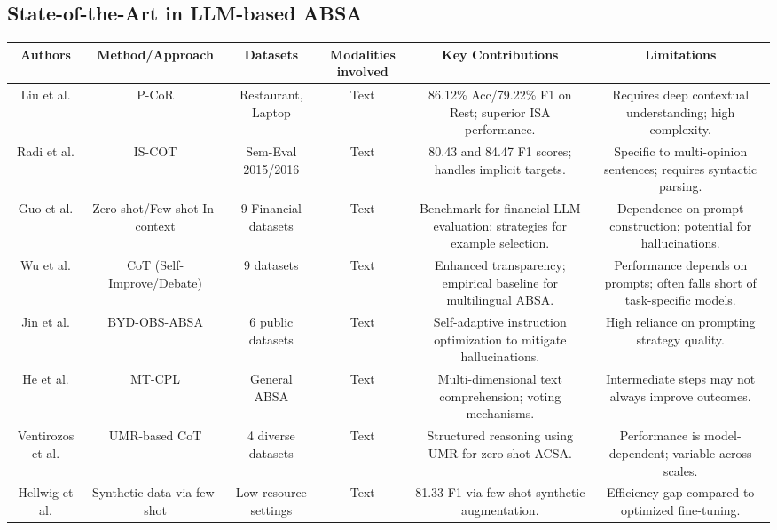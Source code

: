 \documentclass{article}
\begin{document}
\subsection{State-of-the-Art in LLM-based ABSA}
\begin{table}[h!]
\centering
\begin{tabular}{|c|c|c|c|c|c|}
\hline
Authors & Method/Approach & Datasets & Modalities involved & Key Contributions & Limitations \\ \hline
Liu et al.  \parencite{chang_liu_7bb298f7} & P-CoR & Restaurant, Laptop & Text & 86.12\% Acc/79.22\% F1 on Rest; superior ISA performance. & Requires deep contextual understanding; high complexity. \\ \hline
Radi et al.  \parencite{mohammad_radi_96ee5847} & IS-COT & Sem-Eval 2015/2016 & Text & 80.43 and 84.47 F1 scores; handles implicit targets. & Specific to multi-opinion sentences; requires syntactic parsing. \\ \hline
Guo et al.  \parencite{yue_guo_642efc19} & Zero-shot/Few-shot In-context & 9 Financial datasets & Text & Benchmark for financial LLM evaluation; strategies for example selection. & Dependence on prompt construction; potential for hallucinations. \\ \hline
Wu et al.  \parencite{chengyan_wu_4c659eab} & CoT (Self-Improve/Debate) & 9 datasets & Text & Enhanced transparency; empirical baseline for multilingual ABSA. & Performance depends on prompts; often falls short of task-specific models. \\ \hline
Jin et al.  \parencite{weiqiang_jin_5ccfa531} & BYD-OBS-ABSA & 6 public datasets & Text & Self-adaptive instruction optimization to mitigate hallucinations. & High reliance on prompting strategy quality. \\ \hline
He et al.  \parencite{yating_he_0bd5c04f} & MT-CPL & General ABSA & Text & Multi-dimensional text comprehension; voting mechanisms. & Intermediate steps may not always improve outcomes. \\ \hline
Ventirozos et al.  \parencite{filippos_ventirozos_5976f1ad} & UMR-based CoT & 4 diverse datasets & Text & Structured reasoning using UMR for zero-shot ACSA. & Performance is model-dependent; variable across scales. \\ \hline
Hellwig et al.  \parencite{nils_constantin_hellwig_6fa4e097} & Synthetic data via few-shot & Low-resource settings & Text & 81.33 F1 via few-shot synthetic augmentation. & Efficiency gap compared to optimized fine-tuning. \\ \hline

\end{tabular}
\end{table}
\end{document}
